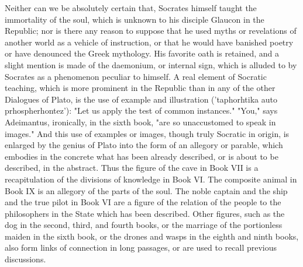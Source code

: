 Neither can we be absolutely certain that, Socrates himself taught the immortality of the soul, which is unknown to his disciple Glaucon in the Republic; nor is there any reason to suppose that he used myths or revelations of another world as a vehicle of instruction, or that he would have banished poetry or have denounced the Greek mythology. His favorite oath is retained, and a slight mention is made of the daemonium, or internal sign, which is alluded to by Socrates as a phenomenon peculiar to himself. A real element of Socratic teaching, which is more prominent in the Republic than in any of the other Dialogues of Plato, is the use of example and illustration ('taphorhtika auto prhospherhontez'): "Let us apply the test of common instances." "You," says Adeimantus, ironically, in the sixth book, "are so unaccustomed to speak in images." And this use of examples or images, though truly Socratic in origin, is enlarged by the genius of Plato into the form of an allegory or parable, which embodies in the concrete what has been already described, or is about to be described, in the abstract. Thus the figure of the cave in Book VII is a recapitulation of the divisions of knowledge in Book VI. The composite animal in Book IX is an allegory of the parts of the soul. The noble captain and the ship and the true pilot in Book VI are a figure of the relation of the people to the philosophers in the State which has been described. Other figures, such as the dog in the second, third, and fourth books, or the marriage of the portionless maiden in the sixth book, or the drones and wasps in the eighth and ninth books, also form links of connection in long passages, or are used to recall previous discussions.

